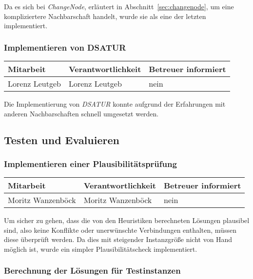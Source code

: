 Da es sich bei \emph{ChangeNode}, erläutert in Abschnitt~\ref{sec:changenode}, um eine kompliziertere Nachbarschaft handelt, wurde sie als eine der letzten implementiert. 

\subsubsection{ Implementieren von DSATUR}

\begin{center}
\begin{tabular}{lll}
	Mitarbeit & Verantwortlichkeit & Betreuer informiert \\
	\hline
	Lorenz Leutgeb & Lorenz Leutgeb & nein \\
\end{tabular}
\end{center}

Die Implementierung von \emph{DSATUR} konnte aufgrund der Erfahrungen mit anderen Nachbarschaften schnell umgesetzt werden.

\subsection{Testen und Evaluieren}

\subsubsection{ Implementieren einer Plausibilitätsprüfung}

\begin{center}
\begin{tabular}{lll}
	Mitarbeit & Verantwortlichkeit & Betreuer informiert \\
	\hline
	Moritz Wanzenböck & Moritz Wanzenböck & nein \\
\end{tabular}
\end{center}

Um sicher zu gehen, dass die von den Heuristiken berechneten Lösungen plausibel sind, also keine Konflikte oder unerwünschte Verbindungen enthalten, müssen diese überprüft werden. Da dies mit steigender Instanzgröße nicht von Hand möglich ist, wurde ein simpler Plau\-si\-bi\-li\-täts\-check implementiert.

\subsubsection{ Berechnung der Lösungen für Testinstanzen}

